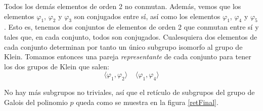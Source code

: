 \documentclass[a4paper, 11pt]{article}
\begin{document}
\begin{solucion}
      Todos los demás elementos de orden 2 no conmutan. Además, vemos que los elementos $\varphi_1$, $\varphi_2$ y $\varphi_3$ son conjugados entre sí, así como los elementos $\varphi_1$, $\varphi_4$ y $\varphi_5$. Esto es, tenemos dos conjuntos de elementos de orden 2 que conmutan entre sí y tales que, en cada conjunto, todos son conjugados. Cualesquiera dos elementos de cada conjunto determinan por tanto un único subgrupo isomorfo al grupo de Klein. Tomamos entonces una pareja \emph{representante} de cada conjunto para tener los dos grupos de Klein que salen:
      \[
      \langle\varphi_1,\varphi_2\rangle \;\;\;\; \langle\varphi_1, \varphi_4\rangle
      \]

      No hay más subgrupos no triviales, así que el retículo de subgrupos del grupo de Galois del polinomio $p$ queda como se muestra en la figura \ref{retFinal}.

      \begin{figure}[ht!]
          \centering
\end{figure}
\end{solucion}
\end{document}
